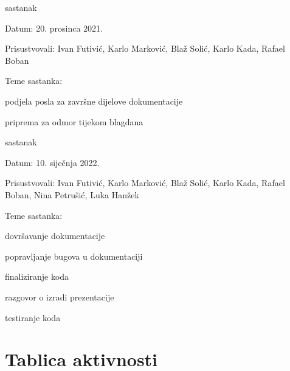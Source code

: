 \begin{packed_enum}
			\item  sastanak
			\item[] \begin{packed_item}
				\item Datum: 20. prosinca 2021.
				\item Prisustvovali:  Ivan Futivić, Karlo Marković, Blaž Solić, Karlo Kada, Rafael Boban
				\item Teme sastanka:
				\begin{packed_item}
					\item  podjela posla za završne dijelove dokumentacije
					\item  priprema za odmor tijekom blagdana
				\end{packed_item}
			\end{packed_item}

			\item  sastanak
			\item[] \begin{packed_item}
				\item Datum: 10. siječnja 2022.
				\item Prisustvovali:  Ivan Futivić, Karlo Marković, Blaž Solić, Karlo Kada, Rafael Boban, Nina Petrušić, Luka Hanžek
				\item Teme sastanka:
				\begin{packed_item}
					\item  dovršavanje dokumentacije
					\item  popravljanje bugova u dokumentaciji
					\item  finaliziranje koda 
					\item  razgovor o izradi prezentacije
					\item  testiranje koda
				\end{packed_item}
			\end{packed_item}
			
		\end{packed_enum}
		
		\eject
		\section*{Tablica aktivnosti}

